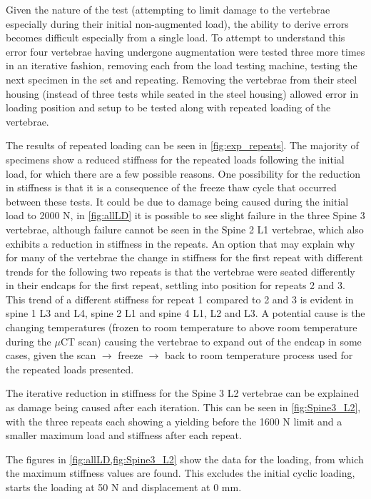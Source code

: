 Given the nature of the test (attempting to limit damage to the vertebrae
especially during their initial non-augmented load), the ability to derive errors
becomes difficult especially from a single load. To attempt to understand this
error four vertebrae having undergone augmentation were tested three more times
in an iterative fashion, removing each from the load testing machine, testing
the next specimen in the set and repeating. Removing the vertebrae from their
steel housing (instead of three tests while seated in the steel housing)
allowed error in loading position and setup to be tested along with repeated
loading of the vertebrae.

The results of repeated loading can be seen in \cref{fig:exp_repeats}. The
majority of specimens show a reduced stiffness for the repeated loads following the
initial load, for which there are a few possible reasons. One possibility for
the reduction in stiffness is that it is a consequence of the freeze thaw cycle
that occurred between these tests. It could be
due to damage being caused during the initial load to 2000 N, in
\cref{fig:allLD} it is possible to see slight failure
in the three Spine 3 vertebrae, although failure cannot be seen in the Spine 2
L1 vertebrae, which also exhibits a reduction in stiffness in the repeats. An
option that may explain why for many of the vertebrae the change in stiffness
for the first repeat with different trends for the following two repeats is
that the vertebrae were seated differently in their endcaps for the first
repeat, settling into position for repeats 2 and 3. This trend of a different
stiffness for repeat 1 compared to 2 and 3 is evident in spine 1 L3 and L4,
spine 2 L1 and spine 4 L1, L2 and L3. A potential cause is the changing
temperatures (frozen to room temperature to above room temperature during the
$\mu$CT scan) causing the vertebrae to expand out of the endcap in some cases,
given the scan $\rightarrow$ freeze $\rightarrow$ back to room temperature
process used for the repeated loads presented.

The iterative reduction in stiffness for the Spine 3 L2 vertebrae can be
explained as damage being caused after each iteration. This can be seen in
\cref{fig:Spine3_L2}, with the three repeats each showing a yielding
before the 1600 N limit and a smaller maximum load and stiffness after each
repeat.

The figures in \cref{fig:allLD,fig:Spine3_L2} show the data for the
loading, from which the maximum stiffness values are found. This excludes the
initial cyclic loading, starts the loading at 50 N and displacement at 0 mm.

